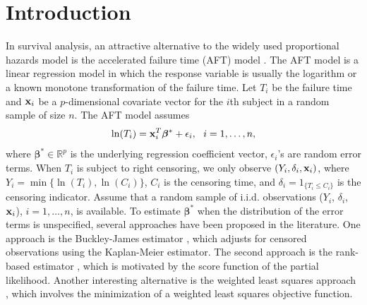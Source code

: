 \documentclass[12pt]{article}
\newcommand{\bx}{\mbox{\bf x}}
\newcommand{\bbeta}{\boldsymbol{\beta}}
\begin{document}
\section{Introduction}
\label{intro}
In survival analysis, an attractive alternative to the widely used  proportional hazards model
\citep{cox1972regression}
 is the  accelerated failure time (AFT) model
\citep{koul1981regression,wei1992accelerated, kalbfleisch2011statistical}.
The AFT model is a linear regression model in which  the response variable is usually the logarithm or a known monotone transformation of the failure time.
Let $T_{i}$ be the failure time and $\bx_i$ be a $p$-dimensional covariate vector for the $i$th subject in a random sample of size $n$. The AFT model assumes
\begin{equation*}
\ln(T_i)=\bx^{T}_{i}\bbeta^*+\epsilon_i,~~i=1,\ldots,n,
\end{equation*}
where $\bbeta^*\in\mathbb{R}^p$ is the underlying regression coefficient vector,  $\epsilon_i$'s are random error terms.
When $T_i$ is subject to right censoring, we only observe $(Y_i, \delta_i, \bx_i)$, where $Y_i=\min\{\ln(T_i), \ln(C_i)\}$, $C_i$ is the censoring time, and $\delta_i=1_{\{T_i\leq C_i\}}$ is the censoring indicator.
Assume that a random sample of i.i.d. observations ($Y_i$, $\delta_i$, $\bx_i$), $i=1,\ldots,n$,  is
available.
To estimate  $\bbeta^*$ when the distribution of the error terms is unspecified, several approaches have been proposed in the literature.
One approach is the Buckley-James estimator
\citep{buckley1979linear},
which adjusts for censored observations using the Kaplan-Meier
estimator. The second approach is the rank-based estimator
\citep{ying1993large},
which is motivated by the score function of the partial likelihood.
Another interesting alternative is the weighted least squares approach
\citep{stute1993strong,stute1996distributional},
which involves the minimization of a weighted least squares objective function.
\end{document}
